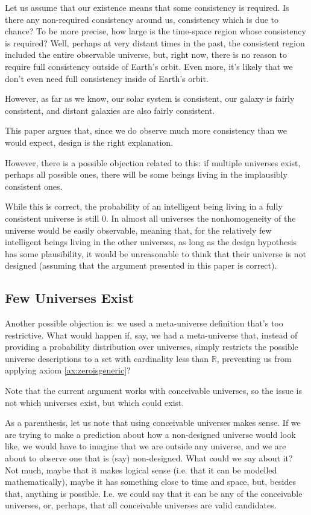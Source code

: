 \documentclass[a4paper
,draft
]{article}
\def\reale{\mathbb{R}}
\newcommand{\paper}[1]{paper}
\begin{document}
Let us assume that our existence means that some consistency is required.
Is there any non-required consistency around us, consistency which is due to
chance? To be more precise,
how large is the time-space region whose consistency is required? Well,
perhaps at very distant times in the past, the consistent region included
the entire observable universe, but, right now, there is no reason to require
full consistency outside of Earth's orbit. Even more,
it's likely that we don't even need full consistency inside of Earth's orbit.

However, as far as we know, our solar system is consistent, our galaxy is
fairly consistent, and distant galaxies are also fairly consistent.

This \paper{} argues that, since we do observe much more consistency
than we would expect, design is the right explanation.

However, there is a possible objection related to this: if multiple universes
exist, perhaps all possible ones, there will be some beings living in the
implausibly consistent ones.

While this is correct, the probability of an intelligent being
living in a fully consistent universe is still $0$.
In almost all universes the nonhomogeneity of the universe would be
easily observable, meaning that, for the relatively few intelligent beings
living in the other universes, as long as the design hypothesis
has some plausibility, it would be unreasonable to think that
their universe is not designed (assuming that the argument presented in
this \paper{} is correct).

\subsection{Few Universes Exist}
\label{sec:fewuniverses}

Another possible objection is: we used a meta-universe definition that's too
restrictive. What would happen if, say, we had a meta-universe that, instead
of providing a probability distribution over universes, simply restricts the
possible universe descriptions to a set with cardinality less than $\reale$,
preventing us from applying axiom \ref{ax:zeroisgeneric}?

Note that the current argument works with conceivable universes, so the issue
is not which universes exist, but which could exist.

As a parenthesis, let us note that using conceivable universes makes sense.
If we are
trying to make a prediction about how a non-designed universe would
look like, we would have to imagine that we are outside any universe, and we are
about to observe one that is (say) non-designed. What could we say about it?
Not much, maybe that it makes logical sense (i.e. that it can be modelled
mathematically), maybe it has something close to time and space, but,
besides that, anything is possible.
I.e. we could say that it can be any
of the conceivable universes, or, perhaps,
that all conceivable universes are valid candidates.
\end{document}
